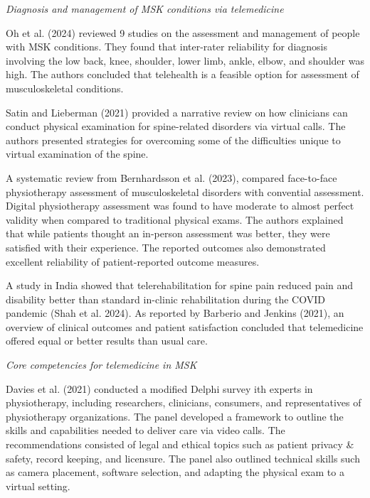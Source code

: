\documentclass[
  letterpaper,
  DIV=11,
  numbers=noendperiod,
  oneside]{scrartcl}
\begin{document}
\emph{Diagnosis and management of MSK conditions via telemedicine}

Oh et al. (2024) reviewed 9 studies on the assessment and management of
people with MSK conditions. They found that inter-rater reliability for
diagnosis involving the low back, knee, shoulder, lower limb, ankle,
elbow, and shoulder was high. The authors concluded that telehealth is a
feasible option for assessment of musculoskeletal conditions.

Satin and Lieberman (2021) provided a narrative review on how clinicians
can conduct physical examination for spine-related disorders via virtual
calls. The authors presented strategies for overcoming some of the
difficulties unique to virtual examination of the spine.

A systematic review from Bernhardsson et al. (2023), compared
face-to-face physiotherapy assessment of musculoskeletal disorders with
convential assessment. Digital physiotherapy assessment was found to
have moderate to almost perfect validity when compared to traditional
physical exams. The authors explained that while patients thought an
in-person assessment was better, they were satisfied with their
experience. The reported outcomes also demonstrated excellent
reliability of patient-reported outcome measures.

A study in India showed that telerehabilitation for spine pain reduced
pain and disability better than standard in-clinic rehabilitation during
the COVID pandemic (Shah et al. 2024). As reported by Barberio and
Jenkins (2021), an overview of clinical outcomes and patient
satisfaction concluded that telemedicine offered equal or better results
than usual care.

\emph{Core competencies for telemedicine in MSK}

Davies et al. (2021) conducted a modified Delphi survey ith experts in
physiotherapy, including researchers, clinicians, consumers, and
representatives of physiotherapy organizations. The panel developed a
framework to outline the skills and capabilities needed to deliver care
via video calls. The recommendations consisted of legal and ethical
topics such as patient privacy \& safety, record keeping, and licensure.
The panel also outlined technical skills such as camera placement,
software selection, and adapting the physical exam to a virtual setting.
\end{document}
